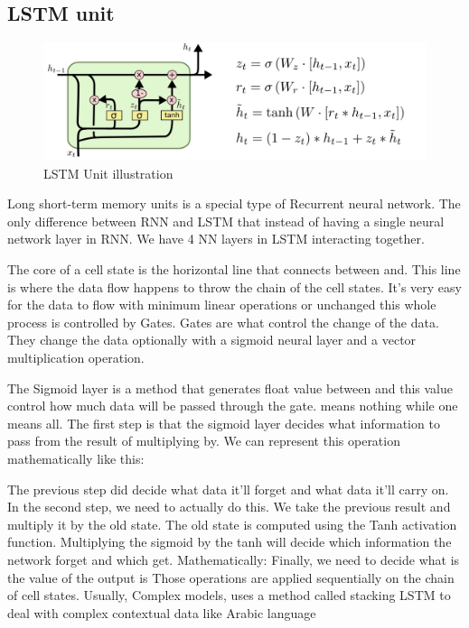 \subsection{LSTM unit}

\vspace{1cm}

\begin{figure}[ht]
    \centering
    \includegraphics[scale=0.7]{Images/LSTM3-var-GRU.png}
    \caption{LSTM Unit illustration}
    \label{fig:lstm}
\end{figure}

\vspace{1cm}
Long short-term memory units is a special type of Recurrent neural network. The only difference between RNN and LSTM that instead of having a single neural network layer in RNN. We have 4 NN layers in LSTM interacting together.

The core of a cell state is the horizontal line that connects between and. This line is where the data flow happens to throw the chain of the cell states. It’s very easy for the data to flow with minimum linear operations or unchanged this whole process is controlled by Gates.
Gates are what control the change of the data. They change the data optionally with a sigmoid neural layer and a vector multiplication operation.

The Sigmoid layer is a method that generates float value between and this value control how much data will be passed through the gate. means nothing while one means all.
The first step is that the sigmoid layer decides what information to pass from the result of multiplying by. We can represent this operation mathematically like this:

The previous step did decide what data it’ll forget and what data it’ll carry on. In the second step, we need to actually do this.
We take the previous result and multiply it by the old state.
The old state is computed using the Tanh activation function. Multiplying the sigmoid by the tanh will decide which information the network forget and which get. Mathematically:
Finally, we need to decide what is the value of the output is
Those operations are applied sequentially on the chain of cell states.
Usually, Complex models, uses a method called stacking LSTM to deal with complex contextual data like Arabic language
